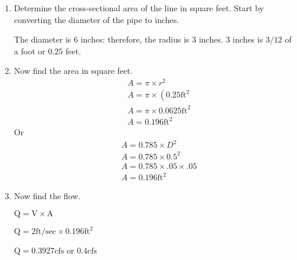 \begin{enumerate}
\item Determine the cross-sectional area of the line in square feet. Start by converting the diameter of the pipe to inches.

The diameter is 6 inches: therefore, the radius is 3 inches. 3 inches is $3 / 12$ of a foot or $0.25$ feet.

\item Now find the area in square feet.
$$
\begin{aligned}
&A=\pi \times r^{2} \\
&A=\pi \times\left(0.25 \mathrm{ft}^{2}\right. \\
&A=\pi \times 0.0625 \mathrm{ft}^{2} \\
&A=0.196 \mathrm{ft}^{2}
\end{aligned}
$$
Or
$$
\begin{aligned}
&A=0.785 \times D^{2} \\
&A=0.785 \times 0.5^{2} \\
&A=0.785 \times .05 \times .05 \\
&A=0.196 \mathrm{ft}^{2}
\end{aligned}
$$

\item Now find the flow.

$\mathrm{Q}=\mathrm{V} \times \mathrm{A}$

$\mathrm{Q}=2 \mathrm{ft} / \mathrm{sec} \times 0.196 \mathrm{ft}^{2}$

$\mathrm{Q}=0.3927 \mathrm{cfs}$ or $0.4 \mathrm{cfs}$
\end{enumerate}


